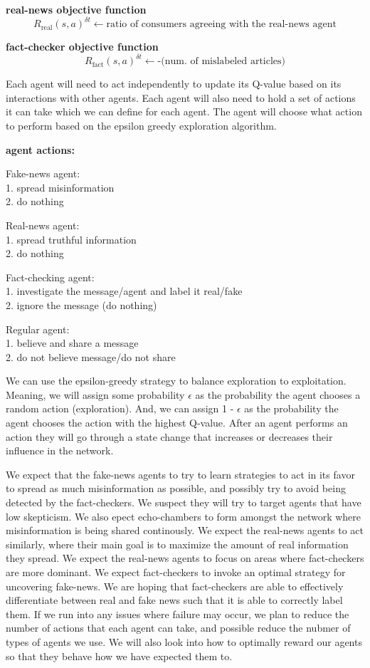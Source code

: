 \documentclass[twoside]{article}
\begin{document}
\textbf{real-news objective function}
\[R_{\text{real}}(s, a)^{\delta t} \leftarrow \text{ratio of consumers agreeing with the real-news agent}
\]

\textbf{fact-checker objective function}
\[R_{\text{fact}}(s, a)^{\delta t} \leftarrow \text{-(num. of mislabeled articles)}
\]

Each agent will need to act independently to update its Q-value based on its interactions with other agents. Each agent will also need to hold a set of actions it can take which we can define for each agent. The agent will choose what action to perform based on the epsilon greedy exploration algorithm. 

\textbf{agent actions:}

Fake-news agent:\\
1. spread misinformation\\
2. do nothing

Real-news agent:\\
1. spread truthful information\\
2. do nothing

Fact-checking agent:\\
1. investigate the message/agent and label it real/fake\\
2. ignore the message (do nothing)

Regular agent:\\
1. believe and share a message\\
2. do not believe message/do not share

We can use the epsilon-greedy strategy to balance exploration to exploitation. Meaning, we will assign some probability 
$\epsilon$
 as the probability the agent chooses a random action (exploration). And, we can assign 1 - $\epsilon$
 as the probability the agent chooses the action with the highest Q-value. After an agent performs an action they will go through a state change that increases or decreases their influence in the network.

We expect that the fake-news agents to try to learn strategies to act in its favor to spread as much misinformation as possible, and possibly try to avoid being detected by the fact-checkers. We suspect they will try to target agents that have low skepticism. We also epect echo-chambers to form amongst the network where misinformation is being shared continously. We expect the real-news agents to act similarly, where their main goal is to maximize the amount of real information they spread. We expect the real-news agents to focus on areas where fact-checkers are more dominant. We expect fact-checkers to invoke an optimal strategy for uncovering fake-news. We are hoping that fact-checkers are able to effectively differentiate between real and fake news such that it is able to correctly label them. If we run into any issues where failure may occur, we plan to reduce the number of actions that each agent can take, and possible reduce the nubmer of types of agents we use. We will also look into how to optimally reward our agents so that they behave how we have expected them to.
\end{document}
